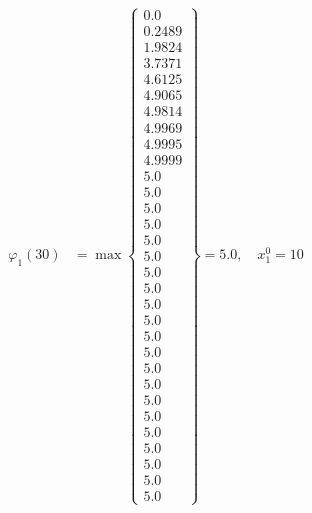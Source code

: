 \documentclass{article}
\begin{document}
\begin{align*}
  
\varphi_{1}(30) &= \max \left\{ \begin{array}{c}
0.0 \\
 0.2489 \\
 1.9824 \\
 3.7371 \\
 4.6125 \\
 4.9065 \\
 4.9814 \\
 4.9969 \\
 4.9995 \\
 4.9999 \\
 5.0 \\
 5.0 \\
 5.0 \\
 5.0 \\
 5.0 \\
 5.0 \\
 5.0 \\
 5.0 \\
 5.0 \\
 5.0 \\
 5.0 \\
 5.0 \\
 5.0 \\
 5.0 \\
 5.0 \\
 5.0 \\
 5.0 \\
 5.0 \\
 5.0 \\
 5.0 \\
 5.0
\end{array} \right\}=5.0,\quad x_{1}^0=10\\
  
  
  

\end{align*}
\end{document}
